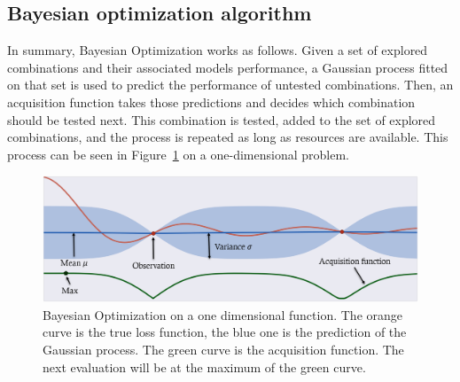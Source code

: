 \subsection{Bayesian optimization algorithm}

In summary, Bayesian Optimization works as follows. Given a set of explored combinations and their associated models performance, a Gaussian process fitted on that set is used to predict the performance of untested combinations. Then, an acquisition function takes those predictions and decides which combination should be tested next. This combination is tested, added to the set of explored combinations, and the process is repeated as long as resources are available. This process can be seen in Figure~\ref{fig:bo} on a one-dimensional problem. 

\begin{figure}[htb]
	\centering
	\includegraphics[width=\linewidth]{img_hyperopt/bo.png}
	\caption[Bayesian Optimization on a one dimensional function]{Bayesian Optimization on a one dimensional function. The orange curve is the true loss function, the blue one is the prediction of the Gaussian process. The green curve is the acquisition function. The next evaluation will be at the maximum of the green curve.}
	\label{fig:bo}
\end{figure}



